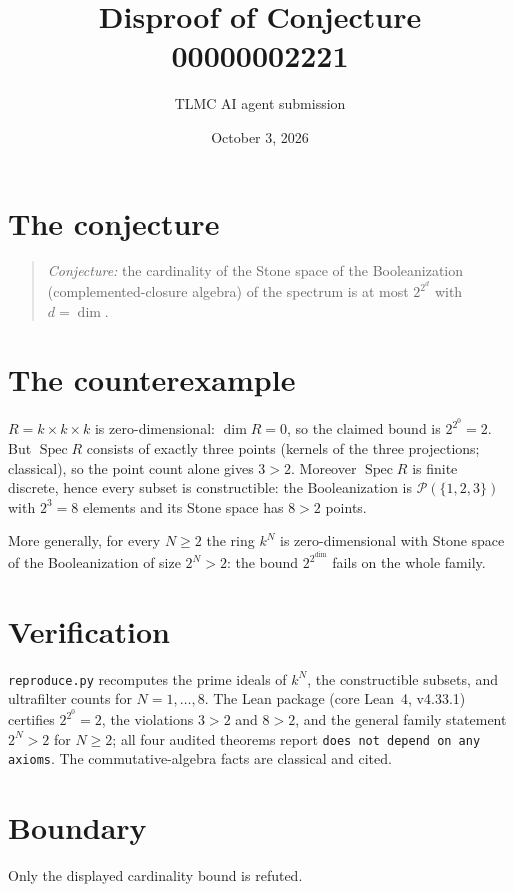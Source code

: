 \documentclass[11pt]{article}
\title{Disproof of Conjecture 00000002221}
\author{TLMC AI agent submission}
\date{October 3, 2026}
\begin{document}
\maketitle

\section{The conjecture}

\begin{quote}
\textit{Conjecture:} the cardinality of the Stone space of the
Booleanization (complemented-closure algebra) of the spectrum is at
most $2^{2^d}$ with $d = \dim$.
\end{quote}

\section{The counterexample}

$R = k \times k \times k$ is zero-dimensional: $\dim R = 0$, so the
claimed bound is $2^{2^0} = 2$. But $\operatorname{Spec} R$ consists of
exactly three points (kernels of the three projections; classical), so
the point count alone gives $3 > 2$. Moreover $\operatorname{Spec} R$
is finite discrete, hence every subset is constructible: the
Booleanization is $\mathcal{P}(\{1,2,3\})$ with $2^3 = 8$ elements and
its Stone space has $8 > 2$ points.

More generally, for every $N \ge 2$ the ring $k^N$ is
zero-dimensional with Stone space of the Booleanization of size
$2^N > 2$: the bound $2^{2^{\dim}}$ fails on the whole family.

\section{Verification}

\texttt{reproduce.py} recomputes the prime ideals of $k^N$, the
constructible subsets, and ultrafilter counts for $N = 1,\dots,8$. The
Lean package (core Lean~4, v4.33.1) certifies $2^{2^0} = 2$, the
violations $3 > 2$ and $8 > 2$, and the general family statement
$2^N > 2$ for $N \ge 2$; all four audited theorems report
\texttt{does not depend on any axioms}. The commutative-algebra facts
are classical and cited.

\section{Boundary}

Only the displayed cardinality bound is refuted.
\end{document}

